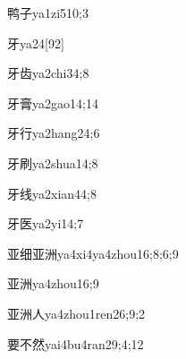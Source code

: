\begin{verbete}{鸭子}{ya1zi5}{10;3}
\end{verbete}

\begin{verbete}{牙}{ya2}{4}[92]
\end{verbete}

\begin{verbete}{牙齿}{ya2chi3}{4;8}
\end{verbete}

\begin{verbete}{牙膏}{ya2gao1}{4;14}
\end{verbete}

\begin{verbete}{牙行}{ya2hang2}{4;6}
\end{verbete}

\begin{verbete}{牙刷}{ya2shua1}{4;8}
\end{verbete}

\begin{verbete}{牙线}{ya2xian4}{4;8}
\end{verbete}

\begin{verbete}{牙医}{ya2yi1}{4;7}
\end{verbete}

\begin{verbete}{亚细亚洲}{ya4xi4ya4zhou1}{6;8;6;9}
\end{verbete}

\begin{verbete}{亚洲}{ya4zhou1}{6;9}
\end{verbete}

\begin{verbete}{亚洲人}{ya4zhou1ren2}{6;9;2}
\end{verbete}

\begin{verbete}{要不然}{yai4bu4ran2}{9;4;12}
\end{verbete}

